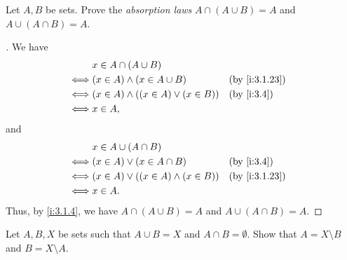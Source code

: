\begin{ex}\label{i:ex:3.1.8}
  Let \(A, B\) be sets.
  Prove the \emph{absorption laws} \(A \cap (A \cup B) = A\) and \(A \cup (A \cap B) = A\).
\end{ex}

\begin{proof}[]
  We have
  \begin{align*}
         & x \in A \cap (A \cup B)                                       \\
    \iff & (x \in A) \land (x \in A \cup B)           &  & \by{i:3.1.23} \\
    \iff & (x \in A) \land ((x \in A) \lor (x \in B)) &  & \by{i:3.4}    \\
    \iff & x \in A,
  \end{align*}
  and
  \begin{align*}
         & x \in A \cup (A \cap B)                                       \\
    \iff & (x \in A) \lor (x \in A \cap B)            &  & \by{i:3.4}    \\
    \iff & (x \in A) \lor ((x \in A) \land (x \in B)) &  & \by{i:3.1.23} \\
    \iff & x \in A.
  \end{align*}
  Thus, by \cref{i:3.1.4}, we have \(A \cap (A \cup B) = A\) and \(A \cup (A \cap B) = A\).
\end{proof}

\begin{ex}\label{i:ex:3.1.9}
  Let \(A, B, X\) be sets such that \(A \cup B = X\) and \(A \cap B = \emptyset\).
  Show that \(A = X \setminus B\) and \(B = X \setminus A\).
\end{ex}


